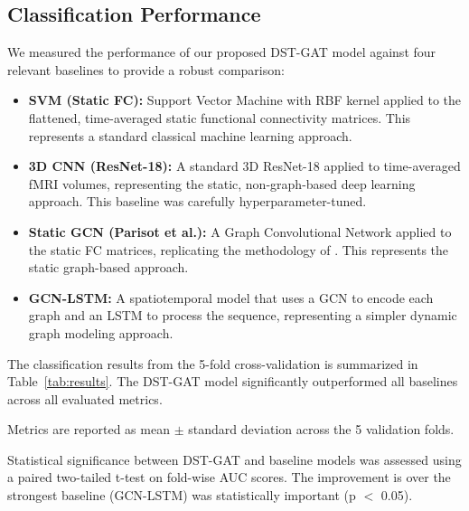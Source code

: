 \documentclass[10pt]{article}
\begin{document}
\subsection{Classification Performance}
We measured the performance of our proposed DST-GAT model against four relevant baselines to provide a robust comparison:
\begin{itemize}
    \item \textbf{SVM (Static FC):}  Support Vector Machine with RBF kernel applied to the flattened, time-averaged static functional connectivity matrices. This represents a standard classical machine learning approach.
    \item \textbf{3D CNN (ResNet-18):} A standard 3D ResNet-18 applied to time-averaged fMRI volumes, representing the static, non-graph-based deep learning approach. This baseline was carefully hyperparameter-tuned.
    \item \textbf{Static GCN (Parisot et al.):} A Graph Convolutional Network applied to the static FC matrices, replicating the methodology of \textcite{parisot2018disease}. This represents the static graph-based approach.
    \item \textbf{GCN-LSTM:} A spatiotemporal model that uses a GCN to encode each graph and an LSTM to process the sequence, representing a simpler dynamic graph modeling approach.
\end{itemize}

The classification results from the 5-fold cross-validation is summarized in Table~\ref{tab:results}. The DST-GAT model significantly outperformed all baselines across all evaluated metrics.

\begin{table}[htbp]
\caption{5-Fold Cross-Validation Classification Performance.}
\label{tab:results}
\begin{center}
\end{center}
\small{Metrics are reported as mean $\pm$ standard deviation across the 5 validation folds.}
\end{table}
Statistical significance between DST-GAT and baseline models was assessed using a paired two-tailed t-test on fold-wise AUC scores. The improvement is over the strongest baseline (GCN-LSTM) was statistically important (p $<$ 0.05).
\end{document}
